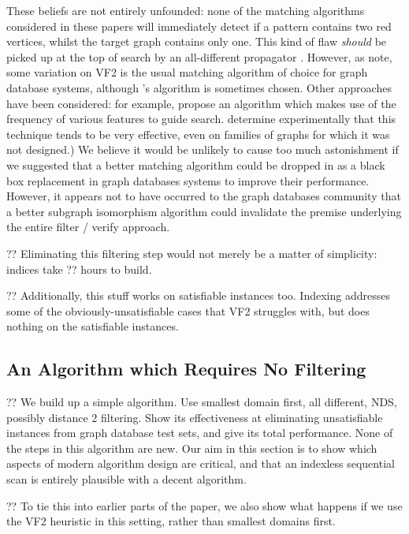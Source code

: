 \documentclass[twoside,11pt]{article}
\newcommand{\citet}[1]{\citeA{#1}}
\newcommand{\citep}[1]{\cite{#1}}
\begin{document}
These beliefs are not entirely unfounded: none of the matching algorithms considered in these papers
will immediately detect if a pattern contains two red vertices, whilst the target graph contains
only one. This kind of flaw \emph{should} be picked up at the top of search by an all-different
propagator \citep{DBLP:conf/aaai/Regin94}.  However, as \citet{DBLP:journals/pvldb/KatsarouNT15}
note, some variation on VF2 \citep{Cordella:2004} is the usual matching algorithm of choice for
graph database systems, although 's algorithm is sometimes
chosen. Other approaches have been considered: for example, \citet{DBLP:journals/pvldb/ShangZLY08}
propose an algorithm which makes use of the frequency of various features to guide search.
\citet{DBLP:journals/pvldb/LeeHKL12} determine experimentally that this technique tends to be very
effective, even on families of graphs for which it was not designed.) We believe it would be
unlikely to cause too much astonishment if we suggested that a better matching algorithm could be
dropped in as a black box replacement in graph databases systems to improve their performance.
However, it appears not to have occurred to the graph databases community that a better subgraph
isomorphism algorithm could invalidate the premise underlying the entire filter / verify approach.

?? Eliminating this filtering step would not merely be a matter of simplicity: indices take ??  hours
to build.

?? Additionally, this stuff works on satisfiable instances too. Indexing addresses some of the
obviously-unsatisfiable cases that VF2 struggles with, but does nothing on the satisfiable
instances.

\subsection{An Algorithm which Requires No Filtering}

?? We build up a simple algorithm. Use smallest domain first, all different, NDS, possibly distance
2 filtering. Show its effectiveness at eliminating unsatisfiable instances from graph database test
sets, and give its total performance.  None of the steps in this algorithm are new. Our aim in this
section is to show which aspects of modern algorithm design are critical, and that an indexless
sequential scan is entirely plausible with a decent algorithm.

?? To tie this into earlier parts of the paper, we also show what happens if we use the VF2
heuristic in this setting, rather than smallest domains first.
\end{document}
